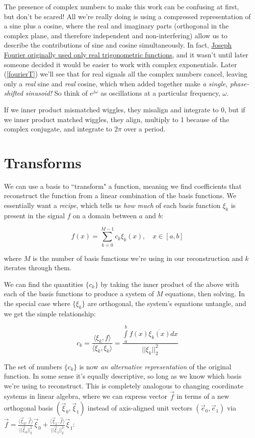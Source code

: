 \documentclass[10pt]{article}
\begin{document}
The presence of complex numbers to make this work can be confusing at first, but don't be scared! All we're really doing is using a compressed representation of a sine plus a cosine, where the real and imaginary parts (orthogonal in the complex plane, and therefore independent and non-interfering) allow us to describe the contributions of sine and cosine simultaneously. In fact, \href{https://math.stackexchange.com/a/1293127/278341}{Joseph Fourier originally used only real trigonometric functions}\cite{complex}, and it wasn't until later someone decided it would be easier to work with complex exponentials. Later (\autoref{fourierT}) we'll see that for real signals all the complex numbers cancel, leaving only a \textit{real} sine and \textit{real} cosine, which when added together make \textit{a single, phase-shifted sinusoid!} So think of $e^{j \omega}$ as oscillations at a particular frequency, $\omega$.

If we inner product mismatched wiggles, they misalign and integrate to 0, but if we inner product matched wiggles, they align, multiply to 1 because of the complex conjugate, and integrate to $2\pi$ over a period.

\section{Transforms}

We can use a basis to ``transform" a function, meaning we find coefficients that reconstruct the function from a linear combination of the basis functions. We essentially want a \textit{recipe}, which tells us \textit{how much} of each basis function $\xi_k$ is present in the signal $f$ on a domain between $a$ and $b$:

$$f(x) = \sum_{k=0}^{M-1} c_k \xi_k(x), \quad x \in [a, b]$$

\noindent where $M$ is the number of basis functions we're using in our reconstruction and $k$ iterates through them.

We can find the quantities $\{c_k\}$ by taking the inner product of the above with each of the basis functions to produce a system of $M$ equations, then solving. In the special case where $\{\xi_k\}$ are orthogonal, the system's equations untangle, and we get the simple relationship:

$$c_k = \frac{\langle \xi_k,f \rangle}{\langle \xi_k,\xi_k \rangle} = \frac{\int\limits_{a}^{b} f(x) \overline{\xi_k(x)} dx}{||\xi_k||_2^2}$$

The set of numbers $\{c_k\}$ is now \textit{an alternative representation} of the original function. In some sense it's equally descriptive, so long as we know which basis we're using to reconstruct. This is completely analogous to changing coordinate systems in linear algebra, where we can express vector $\vec{f}$ in terms of a new orthogonal basis $(\vec{\xi}_0, \vec{\xi}_1)$ instead of axis-aligned unit vectors $(\vec{e}_0,\vec{e}_1)$ via $\vec{f} = \frac{\langle \vec{\xi}_0,\vec{f}\rangle}{||\vec{\xi}_0||_2^2} \vec{\xi}_0 + \frac{\langle \vec{\xi}_1,\vec{f}\rangle}{||\vec{\xi}_1||_2^2} \vec{\xi}_1$:
\end{document}
